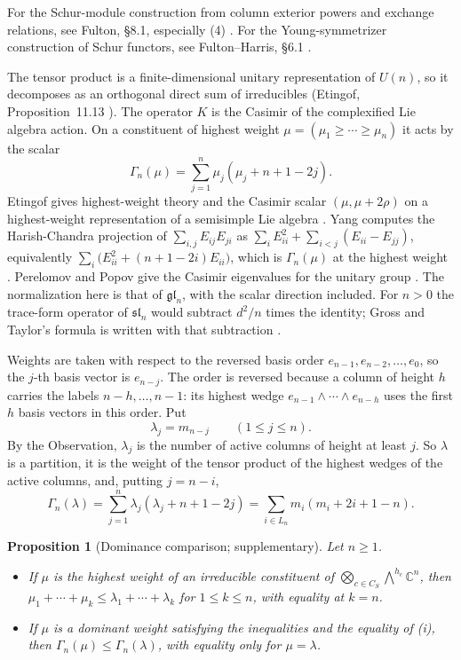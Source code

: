\documentclass[11pt]{amsart}
\newcommand{\notlean}{supplementary}
\newtheorem{proposition}{Proposition}
\theoremstyle{definition}
\theoremstyle{remark}
\begin{document}
For the Schur-module construction from column exterior powers and exchange
relations, see Fulton, \S 8.1, especially (4) \cite{Fulton}. For the
Young-symmetrizer construction of Schur functors, see Fulton--Harris,
\S 6.1 \cite{FultonHarris}.

The tensor product is a finite-dimensional unitary representation of
\(U(n)\), so it decomposes as an orthogonal direct sum of irreducibles
(Etingof, Proposition~11.13 \cite{Etingof}). The operator \(K\) is
the Casimir of the complexified Lie algebra action. On a constituent of
highest weight
\(\mu=(\mu_1\ge\cdots\ge\mu_n)\) it acts by the scalar
\[
\Gamma_n(\mu)=\sum_{j=1}^n\mu_j(\mu_j+n+1-2j).
\]
Etingof gives
highest-weight theory and the Casimir scalar \((\mu,\mu+2\rho)\) on a
highest-weight representation of a semisimple Lie algebra
\cite[lectures 25--26, Lemma~26.6]{Etingof}.
Yang computes the Harish-Chandra projection of \(\sum_{i,j}E_{ij}E_{ji}\) as
\(\sum_i E_{ii}^2+\sum_{i<j}(E_{ii}-E_{jj})\), equivalently
\(\sum_i\bigl(E_{ii}^2+(n+1-2i)E_{ii}\bigr)\), which is \(\Gamma_n(\mu)\) at
the highest weight \cite[Example~5.4]{Yang}. Perelomov and Popov give the
Casimir eigenvalues for the unitary group \cite[\S 2]{PerelomovPopov}. The
normalization here is that of \(\mathfrak{gl}_n\), with the scalar direction
included. For \(n>0\) the trace-form operator of \(\mathfrak{sl}_n\) would
subtract \(d^2/n\) times the identity; Gross and Taylor's formula is written
with that subtraction \cite[(2.1)]{GrossTaylor}.

Weights are taken with respect to the reversed basis
order \(e_{n-1},e_{n-2},\ldots,e_0\), so the \(j\)-th basis vector is
\(e_{n-j}\). The order is reversed because a column of height \(h\) carries
the labels \(n-h,\ldots,n-1\): its highest wedge
\(e_{n-1}\wedge\cdots\wedge e_{n-h}\) uses the first \(h\) basis vectors in
this order. Put
\[
\lambda_j=m_{n-j}\qquad(1\le j\le n).
\]
By the Observation, \(\lambda_j\) is the number of active columns of height
at least \(j\). So \(\lambda\) is a partition, it is the weight of the tensor
product of the highest wedges of the active columns, and, putting \(j=n-i\),
\[
\Gamma_n(\lambda)=\sum_{j=1}^n\lambda_j(\lambda_j+n+1-2j)
=\sum_{i\in L_n}m_i(m_i+2i+1-n).
\]

\begin{proposition}[Dominance comparison; \notlean]\label{prop:10}
Let \(n\ge1\).
\begin{itemize}
\item[(i)] If \(\mu\) is the highest weight of an irreducible constituent of
  \(\bigotimes_{c\in C_S}\bigwedge^{h_c}\mathbb C^n\), then
  \(\mu_1+\cdots+\mu_k\le\lambda_1+\cdots+\lambda_k\) for \(1\le k\le n\),
  with equality at \(k=n\).
\item[(ii)] If \(\mu\) is a dominant weight satisfying the inequalities and
  the equality of (i), then \(\Gamma_n(\mu)\le\Gamma_n(\lambda)\), with
  equality only for \(\mu=\lambda\).
\end{itemize}
\end{proposition}
\end{document}
